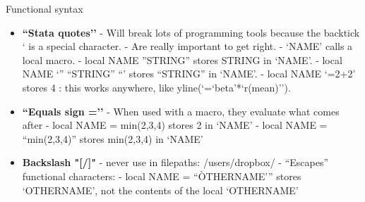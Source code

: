 \documentclass[aspectratio=169]{beamer}
\begin{document}
\begin{frame}{Functional syntax}
\begin{multicols}{2}	
	
	\begin{itemize}[<default overlay specification>]
		\item<1>  \textbf {``Stata quotes’’}
			\newline - Will break lots of programming tools because the backtick ` is a special character.
			\newline - Are really important to get right. 
			\newline - `NAME’ calls a local macro.
			\newline - local NAME ”STRING” stores STRING in `NAME’. 
			\newline - local NAME `” “STRING” “’ stores “STRING” in `NAME’. 
			\newline - local NAME `=2+2’ stores 4 : this works anywhere, like yline(`=`beta’*`r(mean)’’).
		\item<1>  \textbf {``Equals sign =’’}
			\newline - When used with a macro, they evaluate what comes after
			\newline - local NAME = min(2,3,4) stores 2 in `NAME’
			\newline - local NAME = “min(2,3,4)” stores min(2,3,4) in `NAME’
		\item<1>  \textbf {Backslash "[/]"}
			\newline - never use in filepaths: /users/dropbox/
			\newline - “Escapes” functional characters:
			\newline - local NAME = “\`OTHERNAME’” stores `OTHERNAME’, not the contents of the local `OTHERNAME’
	\end{itemize}
	
\end{multicols}
\end{frame}
\end{document}
